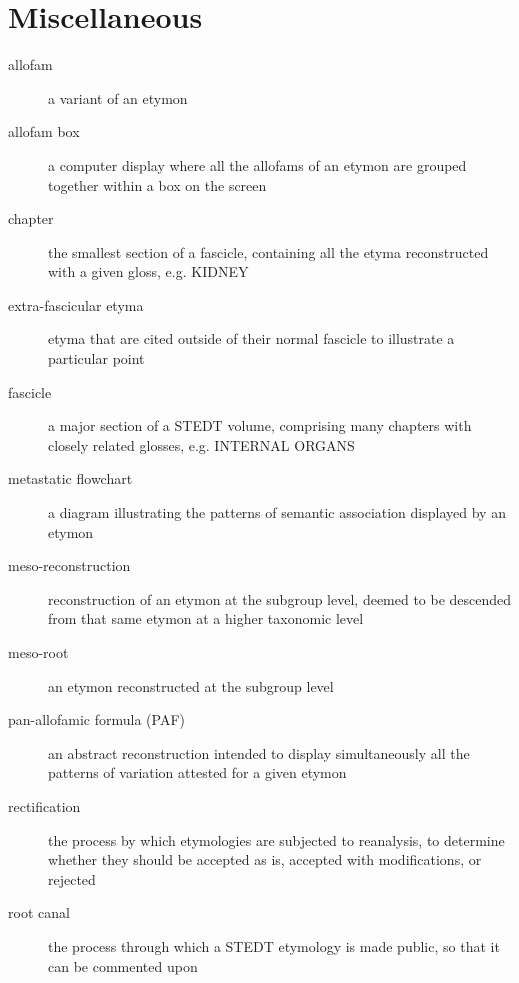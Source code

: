 \section*{Miscellaneous}
\begin{multicols}{2}
\begin{description}
\item[allofam]	a variant of an etymon
\item[allofam box]	a computer display where all the allofams of an etymon are grouped together within a box on the screen
\item[chapter]	the smallest section of a fascicle, containing all the etyma reconstructed with a given gloss, e.g. KIDNEY
\item[extra-fascicular etyma]	etyma that are cited outside of their normal fascicle to illustrate a particular point
\item[fascicle]	a major section of a STEDT volume, comprising many chapters with closely related glosses, e.g. INTERNAL ORGANS
\item[metastatic flowchart]	a diagram illustrating the patterns of semantic association displayed by an etymon
\item[meso-reconstruction]	reconstruction of an etymon at the subgroup level, deemed to be descended from that same etymon at a higher taxonomic level
\item[meso-root]	an etymon reconstructed at the subgroup level
\item[pan-allofamic formula (PAF)]	an abstract reconstruction intended to display simultaneously all the patterns of variation attested for a given etymon
\item[rectification]	the process by which etymologies are subjected to reanalysis, to determine whether they should be accepted as is, accepted with modifications, or rejected
\item[root canal]	the process through which a STEDT etymology is made public, so that it can be commented upon 

\end{description}
\end{multicols}
